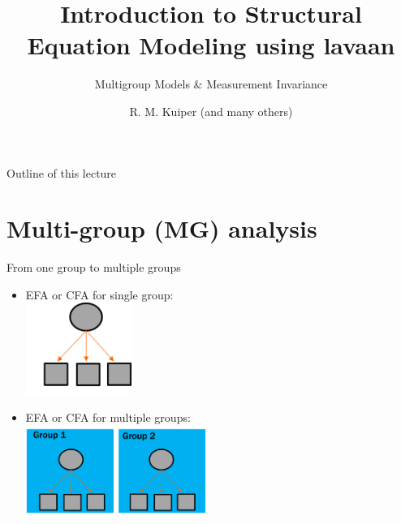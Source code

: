 \documentclass[10pt]{beamer}\usepackage[]{graphicx}\usepackage[]{xcolor}
\title{Introduction to Structural Equation Modeling using lavaan}
\subtitle{Multigroup Models \& Measurement Invariance}
\author{R. M. Kuiper (and many others)}
\institute{Department of Methodology \& Statistics \\ Utrecht University}
\date{}
\begin{document}

\begin{frame}[t, plain]
  \titlepage
\end{frame}

%
\begin{frame}{Outline of this lecture}
\tableofcontents[hidesubsections]
\end{frame}

\section{Multi-group (MG) analysis}
%
\begin{frame}{From one group to multiple groups}
\begin{itemize}
    \item EFA or CFA for single group:\\
    \includegraphics[height=3cm,keepaspectratio]{images/EFAandCFA.png} 
    \item EFA or CFA for multiple groups:\\
    \includegraphics[height=3cm,keepaspectratio]{images/MultipleGroup.png} 
\end{itemize}
\end{frame}
\end{document}
